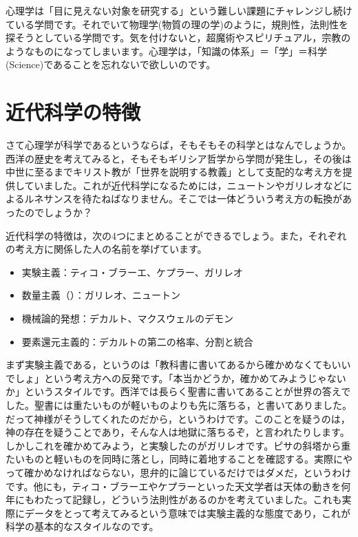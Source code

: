 \documentclass{ltjsbook}
\begin{document}
心理学は「目に見えない対象を研究する」という難しい課題にチャレンジし続けている学問です。それでいて物理学(物質の理の学)のように，規則性，法則性を探そうとしている学問です。気を付けないと，超魔術やスピリチュアル，宗教のようなものになってしまいます。心理学は，「知識の体系」＝「学」＝科学(Science)であることを忘れないで欲しいのです。

\section{近代科学の特徴} 

さて心理学が科学であるというならば，そもそもその科学とはなんでしょうか。西洋の歴史を考えてみると，そもそもギリシア哲学から学問が発生し，その後は中世に至るまでキリスト教が「世界を説明する教義」として支配的な考え方を提供していました。これが近代科学になるためには，ニュートンやガリレオなどによるルネサンスを待たねばなりません。そこでは一体どういう考え方の転換があったのでしょうか？

近代科学の特徴は，次の4つにまとめることができるでしょう。また，それぞれの考え方に関係した人の名前を挙げています。
\begin{itemize}
\item 実験主義：ティコ・ブラーエ、ケプラー、ガリレオ
\item 数量主義（）：ガリレオ、ニュートン
\item 機械論的発想：デカルト、マクスウェルのデモン
\item 要素還元主義的：デカルトの第二の格率、分割と統合
\end{itemize}

まず実験主義である，というのは「教科書に書いてあるから確かめなくてもいいでしょ」という考え方への反発です。「本当かどうか，確かめてみようじゃないか」というスタイルです。西洋では長らく聖書に書いてあることが世界の答えでした。聖書には重たいものが軽いものよりも先に落ちる，と書いてありました。だって神様がそうしてくれたのだから，というわけです。このことを疑うのは，神の存在を疑うことであり，そんな人は地獄に落ちるぞ，と言われたりします。しかしこれを確かめてみよう，と実験したのがガリレオです。ピサの斜塔から重たいものと軽いものを同時に落とし，同時に着地することを確認する。実際にやって確かめなければならない，思弁的に論じているだけではダメだ，というわけです。他にも，ティコ・ブラーエやケプラーといった天文学者は天体の動きを何年にもわたって記録し，どういう法則性があるのかを考えていました。これも実際にデータをとって考えてみるという意味では実験主義的な態度であり，これが科学の基本的なスタイルなのです。
\end{document}
